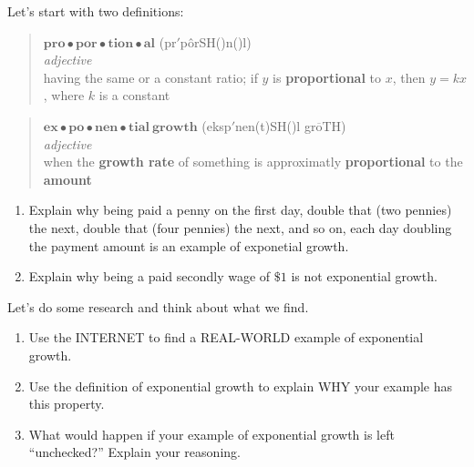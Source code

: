 \documentclass[nooutcomes,noauthor,hints,12pt,handout]{ximera}
\begin{document}
\mynewpage



\begin{question}
  Let's start with two definitions:
  \begin{mdframed}[style=OutcomeStyle]
\begin{quote}
  $\textbf{pro}\bullet\textbf{por}\bullet\textbf{tion}\bullet\textbf{al}$
  (pr{}$'$p\^orSH({})n({})l)
  \\
  
  \textit{adjective}\\

  
\quad having the same or a constant ratio; if $y$ is \textbf{proportional} to
$x$, then $y = k x$, where $k$ is a constant
\end{quote}
  \end{mdframed}

  
  \begin{mdframed}[style=OutcomeStyle]
\begin{quote}
  $\textbf{ex}\bullet\textbf{po}\bullet\textbf{nen}\bullet\textbf{tial}~\textbf{growth}$
  ({}eksp{}$'$nen(t)SH({})l gr$\overline{\mbox{o}}$TH)
  \\
  
  \textit{adjective}\\

  
\quad when the \textbf{growth rate} of something is approximatly
\textbf{proportional} to the \textbf{amount}
\end{quote}
  \end{mdframed}
  \begin{enumerate}
  \item Explain why being paid a penny on the first day, double
    that (two pennies) the next, double that (four pennies) the next,
    and so on, each day doubling the payment amount is an example of
    exponetial growth.

  \item Explain why being a paid secondly wage of $\$1$ is not
    exponential growth.
\end{enumerate}


\end{question}
\mynewpage


\begin{question}
  Let's do some research and think about what we find.
  \begin{enumerate}
    \item Use the INTERNET to find a REAL-WORLD example of exponential growth. 
    \item Use the definition of exponential growth to explain WHY your example  has this property. 
    \item What would happen if your example of exponential growth is left ``unchecked?'' Explain your reasoning. 
  \end{enumerate}


\end{question}
\end{document}

